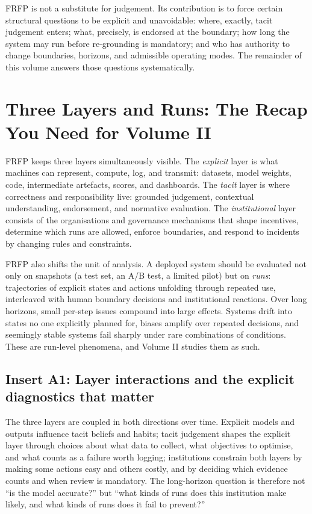 FRFP is not a substitute for judgement. Its contribution is to force certain structural questions to be explicit and unavoidable: where, exactly, tacit judgement enters; what, precisely, is endorsed at the boundary; how long the system may run before re-grounding is mandatory; and who has authority to change boundaries, horizons, and admissible operating modes. The remainder of this volume answers those questions systematically.

\section{Three Layers and Runs: The Recap You Need for Volume II}

FRFP keeps three layers simultaneously visible. The \emph{explicit} layer is what machines can represent, compute, log, and transmit: datasets, model weights, code, intermediate artefacts, scores, and dashboards. The \emph{tacit} layer is where correctness and responsibility live: grounded judgement, contextual understanding, endorsement, and normative evaluation. The \emph{institutional} layer consists of the organisations and governance mechanisms that shape incentives, determine which runs are allowed, enforce boundaries, and respond to incidents by changing rules and constraints.

FRFP also shifts the unit of analysis. A deployed system should be evaluated not only on snapshots (a test set, an A/B test, a limited pilot) but on \emph{runs}: trajectories of explicit states and actions unfolding through repeated use, interleaved with human boundary decisions and institutional reactions. Over long horizons, small per-step issues compound into large effects. Systems drift into states no one explicitly planned for, biases amplify over repeated decisions, and seemingly stable systems fail sharply under rare combinations of conditions. These are run-level phenomena, and Volume II studies them as such.

\subsection{Insert A1: Layer interactions and the explicit diagnostics that matter}
\label{sec:intro-layer-interactions}

The three layers are coupled in both directions over time. Explicit models and outputs influence tacit beliefs and habits; tacit judgement shapes the explicit layer through choices about what data to collect, what objectives to optimise, and what counts as a failure worth logging; institutions constrain both layers by making some actions easy and others costly, and by deciding which evidence counts and when review is mandatory. The long-horizon question is therefore not ``is the model accurate?'' but ``what kinds of runs does this institution make likely, and what kinds of runs does it fail to prevent?''

